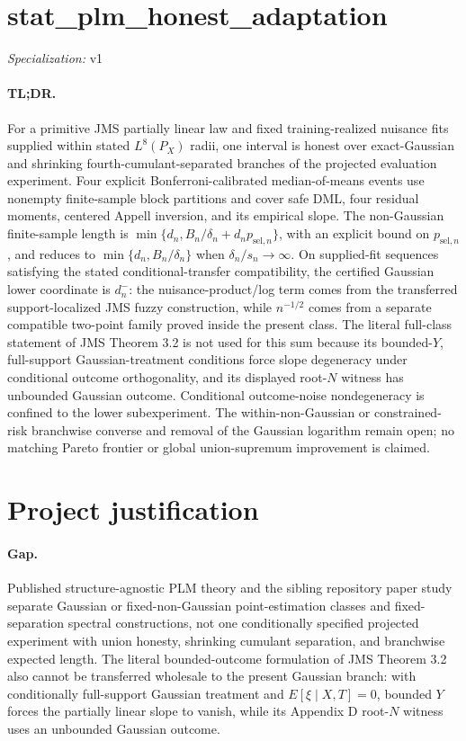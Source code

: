 \documentclass{article}
\begin{document}
\sloppy

\section*{stat\_\allowbreak{}plm\_\allowbreak{}honest\_\allowbreak{}adaptation}

\noindent\textit{Specialization:} v1\par

\paragraph{TL;DR.} For a primitive JMS partially linear law and fixed training-realized nuisance fits supplied within stated \(L^8(P_X)\) radii, one interval is honest over exact-Gaussian and shrinking fourth-cumulant-separated branches of the projected evaluation experiment. Four explicit Bonferroni-calibrated median-of-means events use nonempty finite-sample block partitions and cover safe DML, four residual moments, centered Appell inversion, and its empirical slope. The non-Gaussian finite-sample length is \(\min\{d_n,B_n/\delta_n+d_np_{\mathrm{sel},n}\}\), with an explicit bound on \(p_{\mathrm{sel},n}\), and reduces to \(\min\{d_n,B_n/\delta_n\}\) when \(\delta_n/s_n\to\infty\). On supplied-fit sequences satisfying the stated conditional-transfer compatibility, the certified Gaussian lower coordinate is \(d_n^-\): the nuisance-product/log term comes from the transferred support-localized JMS fuzzy construction, while \(n^{-1/2}\) comes from a separate compatible two-point family proved inside the present class. The literal full-class statement of JMS Theorem 3.2 is not used for this sum because its bounded-\(Y\), full-support Gaussian-treatment conditions force slope degeneracy under conditional outcome orthogonality, and its displayed root-\(N\) witness has unbounded Gaussian outcome. Conditional outcome-noise nondegeneracy is confined to the lower subexperiment. The within-non-Gaussian or constrained-risk branchwise converse and removal of the Gaussian logarithm remain open; no matching Pareto frontier or global union-supremum improvement is claimed.

\section{Project justification}

\paragraph{Gap.} Published structure-agnostic PLM theory and the sibling repository paper study separate Gaussian or fixed-non-Gaussian point-estimation classes and fixed-separation spectral constructions, not one conditionally specified projected experiment with union honesty, shrinking cumulant separation, and branchwise expected length. The literal bounded-outcome formulation of JMS Theorem 3.2 also cannot be transferred wholesale to the present Gaussian branch: with conditionally full-support Gaussian treatment and \(E[\xi\mid X,T]=0\), bounded \(Y\) forces the partially linear slope to vanish, while its Appendix D root-\(N\) witness uses an unbounded Gaussian outcome.
\end{document}
